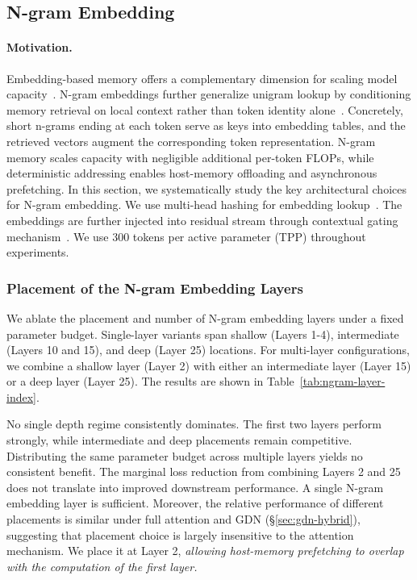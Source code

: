 \subsection{N-gram Embedding}
\label{sec:ngram-emb}
\paragraph{Motivation.}
Embedding-based memory offers a complementary dimension for scaling model capacity~\citep{Jordan2024,google2025gemma3n,rwkvcommunity2025deepembed,gemmateam2026gemma4,sadhukhan2026stem,tseng2026l3}.
N-gram embeddings further generalize unigram lookup by conditioning memory retrieval on local context rather than token identity alone~\citep{huang2021lookuplm,roy2022ngrammer,huang2025overtokenized,yu2025scone,cheng2026engram, liu2026scalingembeddings,chen2026xgram}. 
Concretely, short n-grams ending at each token serve as keys into embedding tables, and the retrieved vectors augment the corresponding token representation.
N-gram memory scales capacity with negligible additional per-token FLOPs, while deterministic addressing enables host-memory offloading and asynchronous prefetching.
In this section, we systematically study the key architectural choices for N-gram embedding.
We use multi-head hashing for embedding lookup~\citep{roy2022ngrammer,huang2025overtokenized}. 
The embeddings are further injected into residual stream through contextual gating mechanism~\citep{cheng2026engram}.
We use 300 tokens per active parameter (TPP) throughout experiments.

\subsubsection{Placement of the N-gram Embedding Layers}

We ablate the placement and number of N-gram embedding layers under a fixed parameter budget.
Single-layer variants span shallow (Layers 1-4), intermediate (Layers 10 and 15), and deep (Layer 25) locations.
For multi-layer configurations, we combine a shallow layer (Layer 2) with either an intermediate layer (Layer 15) or a deep layer (Layer 25).
The results are shown in Table~\ref{tab:ngram-layer-index}.

No single depth regime consistently dominates. 
The first two layers perform strongly, while intermediate and deep placements remain competitive.
Distributing the same parameter budget across multiple layers yields no consistent benefit. 
The marginal loss reduction from combining Layers 2 and 25 does not translate into improved downstream performance. 
A single N-gram embedding layer is sufficient. 
Moreover, the relative performance of different placements is similar under full attention and GDN (\S\ref{sec:gdn-hybrid}), suggesting that placement choice is largely insensitive to the attention mechanism.
We place it at Layer 2, \textit{allowing host-memory prefetching to overlap with the computation of the first layer.}

